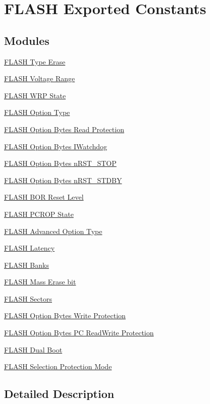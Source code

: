 \hypertarget{group___f_l_a_s_h_ex___exported___constants}{}\section{F\+L\+A\+SH Exported Constants}
\label{group___f_l_a_s_h_ex___exported___constants}
\subsection*{Modules}
\begin{DoxyCompactItemize}
\item 
\hyperlink{group___f_l_a_s_h_ex___type___erase}{F\+L\+A\+S\+H Type Erase}
\item 
\hyperlink{group___f_l_a_s_h_ex___voltage___range}{F\+L\+A\+S\+H Voltage Range}
\item 
\hyperlink{group___f_l_a_s_h_ex___w_r_p___state}{F\+L\+A\+S\+H W\+R\+P State}
\item 
\hyperlink{group___f_l_a_s_h_ex___option___type}{F\+L\+A\+S\+H Option Type}
\item 
\hyperlink{group___f_l_a_s_h_ex___option___bytes___read___protection}{F\+L\+A\+S\+H Option Bytes Read Protection}
\item 
\hyperlink{group___f_l_a_s_h_ex___option___bytes___i_watchdog}{F\+L\+A\+S\+H Option Bytes I\+Watchdog}
\item 
\hyperlink{group___f_l_a_s_h_ex___option___bytes__n_r_s_t___s_t_o_p}{F\+L\+A\+S\+H Option Bytes n\+R\+S\+T\+\_\+\+S\+T\+OP}
\item 
\hyperlink{group___f_l_a_s_h_ex___option___bytes__n_r_s_t___s_t_d_b_y}{F\+L\+A\+S\+H Option Bytes n\+R\+S\+T\+\_\+\+S\+T\+D\+BY}
\item 
\hyperlink{group___f_l_a_s_h_ex___b_o_r___reset___level}{F\+L\+A\+S\+H B\+O\+R Reset Level}
\item 
\hyperlink{group___f_l_a_s_h_ex___p_c_r_o_p___state}{F\+L\+A\+S\+H P\+C\+R\+O\+P State}
\item 
\hyperlink{group___f_l_a_s_h_ex___advanced___option___type}{F\+L\+A\+S\+H Advanced Option Type}
\item 
\hyperlink{group___f_l_a_s_h___latency}{F\+L\+A\+S\+H Latency}
\item 
\hyperlink{group___f_l_a_s_h_ex___banks}{F\+L\+A\+S\+H Banks}
\item 
\hyperlink{group___f_l_a_s_h_ex___mass_erase__bit}{F\+L\+A\+S\+H Mass Erase bit}
\item 
\hyperlink{group___f_l_a_s_h_ex___sectors}{F\+L\+A\+S\+H Sectors}
\item 
\hyperlink{group___f_l_a_s_h_ex___option___bytes___write___protection}{F\+L\+A\+S\+H Option Bytes Write Protection}
\item 
\hyperlink{group___f_l_a_s_h_ex___option___bytes___p_c___read_write___protection}{F\+L\+A\+S\+H Option Bytes P\+C Read\+Write Protection}
\item 
\hyperlink{group___f_l_a_s_h_ex___dual___boot}{F\+L\+A\+S\+H Dual Boot}
\item 
\hyperlink{group___f_l_a_s_h_ex___selection___protection___mode}{F\+L\+A\+S\+H Selection Protection Mode}
\end{DoxyCompactItemize}


\subsection{Detailed Description}
